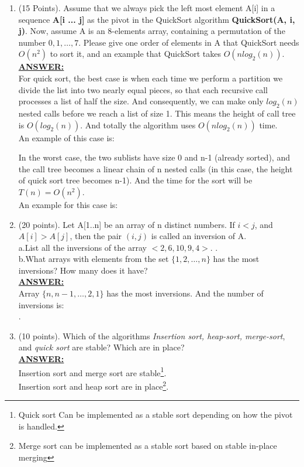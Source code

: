 \documentclass{article}
\newcommand{\answer}{\textbf{\\\underline{ANSWER:}\\}}
\begin{document}
\begin{enumerate}
\item (15 Points). Assume that we always pick the left most element
A[i] in a sequence \textbf{A[i ... j]} as the pivot in the QuickSort
algorithm \textbf{QuickSort(A, i, j)}. Now, assume A is an 8-elements
array, containing a permutation of the number $0, 1, \ldots,7$. Please give
one order of elements in A that QuickSort needs $O(n^2)$ to sort it,
and an example that QuickSort takes $O(nlog_2(n))$.
\answer For quick sort, the best case is when each time we perform a
partition we divide the list into two nearly equal pieces, so that
each recursive call processes a list of half the size. And
consequently, we can make only $log_2(n)$ nested calls before we reach
a list of size 1. This means the height of call tree is $O(log_2(n))$. 
And totally the algorithm uses $O(nlog_2(n))$ time. \\
An example of this case is: 

In the worst case, the two sublists have size 0 and n-1 (already
sorted), and the call tree becomes a linear chain of n nested
calls (in this case, the height of quick sort tree becomes n-1). And
the time for the sort will be $T(n)=O(n^2)$.\\ 
An example for this case is: 

\item (20 points). Let A[1..n] be an array of n distinct numbers. If $i
  < j $, and $A[i]>A[j]$, then the pair $(i,j)$ is called an inversion of
  A. \\
  a.List all the inversions of the array $< 2, 6, 10, 9, 4>$.
  . \\
  b.What arrays with elements from the set $\{1,2,\ldots,n\}$ has the
  most inversions? How many does it have? 
  \answer Array $\{n, n-1, \ldots, 2, 1\}$ has the most
  inversions. And the number of inversions is: \\
  .

\item (10 points). Which of the algorithms {\it Insertion sort, heap-sort,
  merge-sort}, and {\it quick sort} are stable? Which are in place?
  \answer 
Insertion sort and merge sort are stable\footnote{Quick sort Can be
  implemented as a stable sort depending on how the pivot is handled.}. \\
Insertion sort and heap sort are in place\footnote{Merge sort can be
  implemented as a stable sort based on stable in-place merging}.
\end{enumerate}
\end{document}
